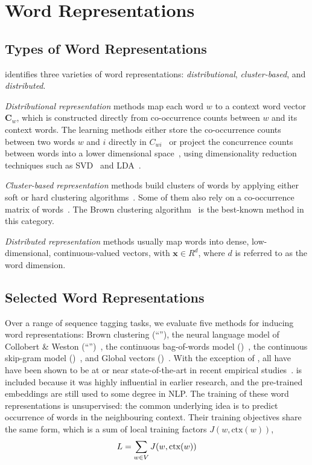 \section{Word Representations}
\label{wordrep} 

\subsection{Types of Word Representations}

 identifies three varieties of word
representations: \textit{distributional}, \textit{cluster-based}, and
\textit{distributed}.

\textit{Distributional representation} methods map each word $w$ to a
context word vector $\mathbf{C}_w$, which is constructed directly from
co-occurrence counts between $w$ and its context words.  The learning
methods either store the co-occurrence counts between two words $w$ and
$i$ directly in
$C_{wi}$~\cite{sahlgren2006word,turney2010frequency,honkela1997self} or
project the concurrence counts between words into a lower dimensional
space~\cite{vrehuuvrek2010software,lund1996producing}, using
dimensionality reduction techniques such as SVD~\cite{dumais1988using} and
LDA~\cite{blei2003latent}.

\textit{Cluster-based representation} methods build clusters of words by applying either soft or hard clustering algorithms~\cite{lin2009phrase,li2005semi}. Some of them also rely on a co-occurrence matrix of words~\cite{pereira1993distributional}. The Brown clustering algorithm~\cite{Brown92class-basedn-gram} is the best-known method in this category.

\textit{Distributed representation} methods usually map words into dense,
low-dimensional, continuous-valued vectors, with $\mathbf{x} \in
R^d$, where $d$ is referred to as the word dimension.

\subsection{Selected Word Representations}

Over a range of sequence tagging tasks, we evaluate five methods for
inducing word representations: Brown clustering
\cite{Brown92class-basedn-gram} (``\brown''), the neural language model
of Collobert \& Weston (``\CW'')~\cite{collobert2011natural}, the
continuous bag-of-words model (\CBOW)~\cite{Mikolov13}, the continuous
skip-gram model (\Skipgram)~\cite{Mikolov13NIPS}, and Global vectors
(\Glove)~\cite{pennington2014glove}. With the exception of \CW, all have
have been shown to be at or near state-of-the-art in recent empirical
studies~\cite{turian2010word,pennington2014glove}. \CW is included
because it was highly influential in earlier research, and the pre-trained embeddings are
still used to some degree in NLP. The training of these word
representations is unsupervised: the common underlying idea is to
predict occurrence of words in the neighbouring context. Their training
objectives share the same form, which is a sum of local training factors
$J(w, \text{ctx}(w))$,  
\begin{displaymath}
  L = \sum_{w \in V} J(w, \text{ctx}(w))
\end{displaymath}

